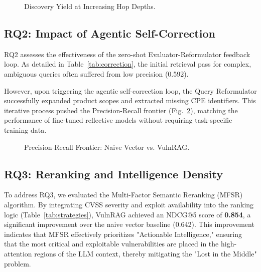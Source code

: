 \begin{table}[htbp]
    \centering
    \caption{Retrieval Performance Comparison: Baseline vs. VulnRAG}
    \label{tab:performance}
    \resizebox{\columnwidth}{!}{}
\end{table}

\begin{figure}[htbp]
    \centering
    \resizebox{\columnwidth}{!}{}
    \caption{Discovery Yield at Increasing Hop Depths.}
    \label{fig:yield}
\end{figure}

\subsection{RQ2: Impact of Agentic Self-Correction}
RQ2 assesses the effectiveness of the zero-shot Evaluator-Reformulator feedback loop. As detailed in Table~\ref{tab:correction}, the initial retrieval pass for complex, ambiguous queries often suffered from low precision (0.592).

\begin{table}[htbp]
    \centering
    \caption{Impact of Agentic Self-Correction on Retrieval Precision}
    \label{tab:correction}
    \resizebox{\columnwidth}{!}{}
\end{table}
However, upon triggering the agentic self-correction loop, the Query Reformulator successfully expanded product scopes and extracted missing CPE identifiers. This iterative process pushed the Precision-Recall frontier (Fig.~\ref{fig:pr_frontier}), matching the performance of fine-tuned reflective models without requiring task-specific training data.

\begin{figure}[htbp]
    \centering
    \resizebox{\columnwidth}{!}{}
    \caption{Precision-Recall Frontier: Naive Vector vs. VulnRAG.}
    \label{fig:pr_frontier}
\end{figure}

\subsection{RQ3: Reranking and Intelligence Density}
To address RQ3, we evaluated the Multi-Factor Semantic Reranking (MFSR) algorithm. By integrating CVSS severity and exploit availability into the ranking logic (Table~\ref{tab:strategies}), VulnRAG achieved an NDCG@5 score of \textbf{0.854}, a significant improvement over the naive vector baseline (0.642). This improvement indicates that MFSR effectively prioritizes "Actionable Intelligence," ensuring that the most critical and exploitable vulnerabilities are placed in the high-attention regions of the LLM context, thereby mitigating the "Lost in the Middle" problem.

